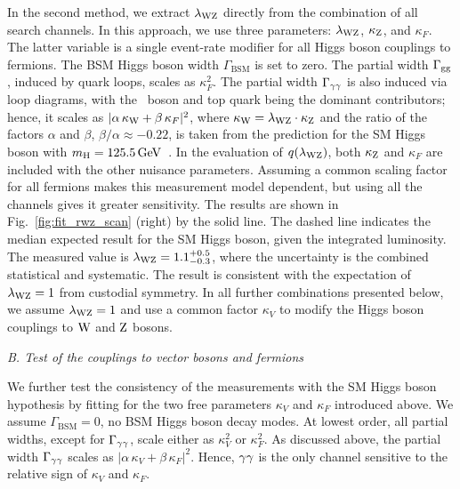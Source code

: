\documentclass[12pt,twoside,a4paper,cmspaper,final,collab]{cms-tdr}
\begin{document}
In the second method, we extract $\lambda_{\mathrm{W}\mathrm{Z}}$ directly from the combination of all search
channels.  In this approach, we use  three parameters: $\lambda_{\mathrm{W}\mathrm{Z}}$,
$\kappa_{\mathrm{Z}}$, and $\kappa_F$. The latter variable is a single event-rate modifier for
all Higgs boson couplings to fermions. The BSM Higgs boson width $\Gamma_{\mathrm{BSM}}$ is set to zero.
The partial width $\Gamma_{\mathrm{g}\mathrm{g}}$, induced by quark loops, scales as $\kappa_F^2$.
The partial width $\Gamma_{\gamma\gamma}$ is also induced via
loop diagrams, with the \PW\ boson and top quark being the dominant contributors;
hence, it scales as $| \alpha \, \kappa_{\mathrm{W}} + \beta \, \kappa_F |^2$,
where $\kappa_{\mathrm{W}} = \lambda_{\mathrm{W}\mathrm{Z}} \cdot \kappa_{\mathrm{Z}}$ and
the ratio of the factors $\alpha$ and $\beta$,  $\beta / \alpha \approx -0.22$, is taken from the prediction
for the SM Higgs boson with $m_{\mathrm{H}}=125.5\,\text{Ge\hspace{-.08em}V}$~\cite{Spira:1995rr}.
In the evaluation of $q (\lambda_{\mathrm{W}\mathrm{Z}})$,
both $\kappa_{\mathrm{Z}}$ and $\kappa_F$ are included with the other nuisance
parameters. Assuming a common scaling factor for all fermions makes this measurement
model dependent, but using all the channels gives it
greater
sensitivity.
The results are shown in Fig.~\ref{fig:fit_rwz_scan} (right)
by the solid line. The dashed line indicates the median expected result for the SM Higgs boson,
given the integrated luminosity.
The measured value is $\lambda_{\mathrm{W}\mathrm{Z}} = 1.1^{+0.5}_{-0.3}$, where the uncertainty is
the combined statistical and systematic. The result is
consistent with the expectation of $\lambda_{\mathrm{W}\mathrm{Z}} =1$ from
custodial symmetry.  In all further combinations
presented below, we assume $\lambda_{\mathrm{W}\mathrm{Z}}=1$ and use a common factor $\kappa_V$
to modify the Higgs boson couplings to $\mathrm{W}$ and $\mathrm{Z}$ bosons.







\textit{B. Test of the couplings to vector bosons and fermions}

We further test the consistency of the measurements with the SM
Higgs boson hypothesis by fitting for the two free parameters $\kappa_V$ and $\kappa_F$ introduced above.
We assume  $\Gamma_{\mathrm{BSM}}=0$, \ie no BSM Higgs boson decay modes.
At lowest order, all partial widths,
except for $\Gamma_{\gamma\gamma}$, scale either as
$\kappa^2_V$ or $\kappa^2_F$.
As discussed above, the partial width $\Gamma_{\gamma\gamma}$
scales as $| \alpha \, \kappa_V + \beta \, \kappa_F |^2$.
Hence, $\gamma\gamma$ is the only channel sensitive to the relative sign of
$\kappa_V$ and $\kappa_F$.
\end{document}
